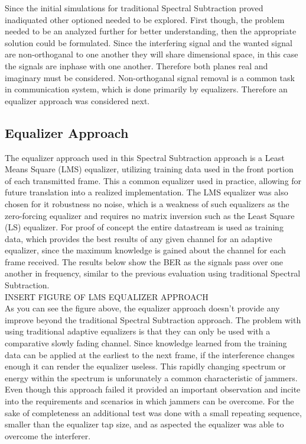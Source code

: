 Since the initial simulations for traditional Spectral Subtraction proved inadiquated other optioned needed to be explored.  First though, the problem needed to be an analyzed further for better understanding, then the appropriate solution could be formulated.  
Since the interfering signal and the wanted signal are non-orthoganal to one another they will share dimensional space, in this case the signals are inphase with one another.  Therefore both planes real and imaginary must be considered.  Non-orthoganal signal removal is a common task in communication system, which is done primarily by equalizers.  Therefore an equalizer approach was considered next.\\

\subsection{Equalizer Approach}

The equalizer approach used in this Spectral Subtraction approach is a Least Means Square (LMS) equalizer, utilizing training data used in the front portion of each transmitted frame.  This a common equalizer used in practice, allowing for future translation into a realized implementation.  The LMS equalizer was also chosen for it robustness no noise, which is a weakness of such equalizers as the zero-forcing equalizer and requires no matrix inversion such as the Least Square (LS) equalizer.  For proof of concept the entire datastream is used as training data, which provides the best results of any given channel for an adaptive equalizer, since the maximum knowledge is gained about the channel for each frame received.  The results below show the BER as the signals pass over one another in frequency, similar to the previous evaluation using traditional Spectral Subtraction.\\
  
INSERT FIGURE OF LMS EQUALIZER APPROACH\\

As you can see the figure above, the equalizer approach doesn't provide any improve beyond the traditional Spectral Subtraction approach.  The problem with using traditional adaptive equalizers is that they can only be used with a comparative slowly fading channel.  Since knowledge learned from the training data can be applied at the earliest to the next frame, if the interference changes enough it can render the equalizer useless.  This rapidly changing spectrum or energy within the spectrum is unforunately a common characteristic of jammers.  Even though this approach failed it provided an important observation and incite into the requirements and scenarios in which jammers can be overcome.  For the sake of completeness an additional test was done with a small repeating sequence, smaller than the equalizer tap size, and as aspected the equalizer was able to overcome the interferer.\\

